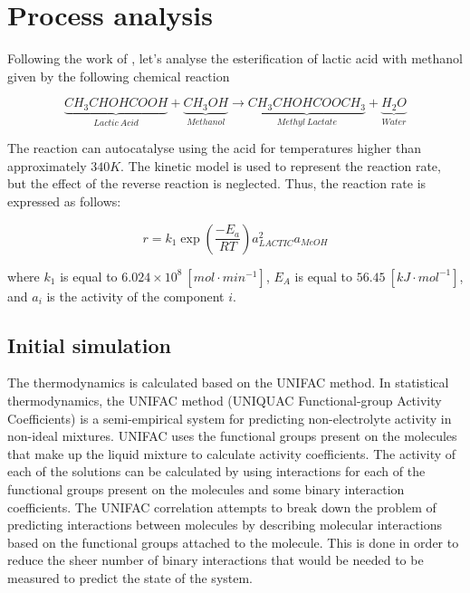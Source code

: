 \chapter{Process analysis}

Following the work of \cite{SegoviaHernandez2020}, let's analyse the esterification of lactic acid with methanol given by the following chemical reaction

\begin{equation}
	\underbrace{CH_3CHOHCOOH}_{Lactic~Acid} + \underbrace{CH_3OH}_{Methanol} \rightarrow \underbrace{CH_3CHOHCOOCH_3}_{Methyl~Lactate} + \underbrace{H_2O}_{Water}
\end{equation}

The reaction can autocatalyse using the acid for temperatures higher than approximately $340 K$. The kinetic model is used to represent the reaction rate, but the effect of the reverse reaction is neglected. Thus, the reaction rate is expressed as follows:

\begin{equation}
	r = k_1 \exp\left( \frac{-E_a}{RT} \right) a^2_{LACTIC} a_{MeOH}
\end{equation}

where $k_1$ is equal to $6.024 \times 10^8 ~[mol \cdot min^{-1}]$, $E_A$ is equal to $56.45~[kJ\cdot mol^{-1}]$, and $a_i$ is the activity of the component $i$.

\section{Initial simulation}

The thermodynamics is calculated based on the UNIFAC method. In statistical thermodynamics, the UNIFAC method (UNIQUAC Functional-group Activity Coefficients) is a semi-empirical system for predicting non-electrolyte activity in non-ideal mixtures. UNIFAC uses the functional groups present on the molecules that make up the liquid mixture to calculate activity coefficients. The activity of each of the solutions can be calculated by using interactions for each of the functional groups present on the molecules and some binary interaction coefficients. The UNIFAC correlation attempts to break down the problem of predicting interactions between molecules by describing molecular interactions based on the functional groups attached to the molecule. This is done in order to reduce the sheer number of binary interactions that would be needed to be measured to predict the state of the system.

